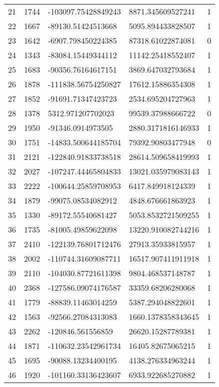 \begin{longtable}{lllll}
    21 & 1744 & -103097.75428849243 & 8871.345609527241 & 1 \\
    22 & 1667 & -89130.51424513668 & 5095.894433828507 & 1 \\
    23 & 1642 & -6907.798450224385 & 87318.61022874081 & 0 \\
    24 & 1343 & -83084.15449344112 & 11142.25418552407 & 1 \\
    25 & 1683 & -90356.76164617151 & 3869.647032793684 & 1 \\
    26 & 1878 & -111838.56754250827 & 17612.15886354308 & 1 \\
    27 & 1852 & -91691.71347423723 & 2534.695204727963 & 1 \\
    28 & 1378 & 5312.971207702023 & 99539.37988666722 & 0 \\
    29 & 1950 & -91346.0914973505 & 2880.3171816146933 & 1 \\
    30 & 1751 & -14833.500644185704 & 79392.90803477948 & 0 \\
    31 & 2121 & -122840.91833738518 & 28614.509658419993 & 1 \\
    32 & 2027 & -107247.44465804833 & 13021.035979083143 & 1 \\
    33 & 2222 & -100644.25859708953 & 6417.849918124339 & 1 \\
    34 & 1879 & -99075.08534082912 & 4848.676661863923 & 1 \\
    35 & 1330 & -89172.55540681427 & 5053.8532721509255 & 1 \\
    36 & 1735 & -81005.49859622098 & 13220.910082744216 & 1 \\
    37 & 2410 & -122139.76801712476 & 27913.35933815957 & 1 \\
    38 & 2002 & -110744.31609087711 & 16517.907411911918 & 1 \\
    39 & 2110 & -104030.87721611398 & 9804.468537148787 & 1 \\
    40 & 2368 & -127586.09074176587 & 33359.68206280068 & 1 \\
    41 & 1779 & -88839.11463014259 & 5387.294048822601 & 1 \\
    42 & 1563 & -92566.27084313083 & 1660.1378358343645 & 1 \\
    43 & 2262 & -120846.561556859 & 26620.15287789381 & 1 \\
    44 & 1871 & -110632.23542961734 & 16405.82675065215 & 1 \\
    45 & 1695 & -90088.13234400195 & 4138.276334963244 & 1 \\
    46 & 1920 & -101160.33136423607 & 6933.922685270882 & 1 \\

\end{longtable}
